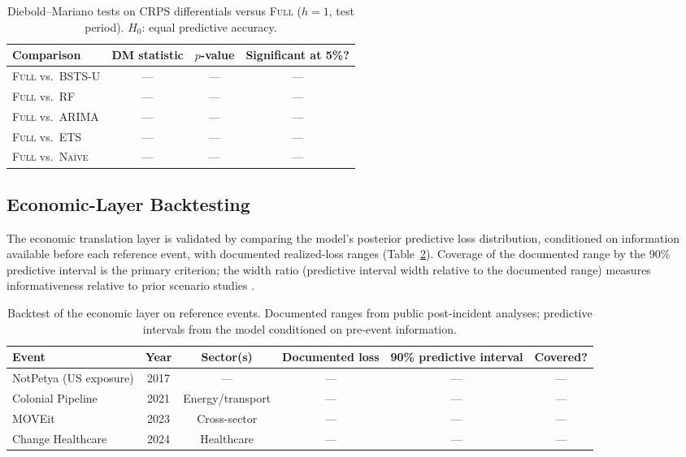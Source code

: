 \documentclass[review]{elsarticle}
\begin{document}
\begin{table}
\centering
\caption{Diebold--Mariano tests on CRPS differentials versus \textsc{Full} ($h=1$, test period). $H_0$: equal predictive accuracy.}
\label{tab:dm}
\small
\begin{tabular}{lccc}
\toprule
Comparison & DM statistic & $p$-value & Significant at 5\%? \\
\midrule
\textsc{Full} vs.\ \textsc{BSTS-U}   & --- & --- & --- \\
\textsc{Full} vs.\ \textsc{RF}       & --- & --- & --- \\
\textsc{Full} vs.\ \textsc{ARIMA}    & --- & --- & --- \\
\textsc{Full} vs.\ \textsc{ETS}      & --- & --- & --- \\
\textsc{Full} vs.\ \textsc{Na\"ive}  & --- & --- & --- \\
\bottomrule
\end{tabular}
\end{table}

\subsection{Economic-Layer Backtesting}

The economic translation layer is validated by comparing the model's posterior predictive loss distribution, conditioned on information available before each reference event, with documented realized-loss ranges (Table~\ref{tab:events}). Coverage of the documented range by the 90\% predictive interval is the primary criterion; the width ratio (predictive interval width relative to the documented range) measures informativeness relative to prior scenario studies \citep{welburn2022}.

\begin{table}
\centering
\caption{Backtest of the economic layer on reference events. Documented ranges from public post-incident analyses; predictive intervals from the model conditioned on pre-event information.}
\label{tab:events}
\small
\begin{tabular}{lccccc}
\toprule
Event & Year & Sector(s) & Documented loss & 90\% predictive interval & Covered? \\
\midrule
NotPetya (US exposure)  & 2017 & --- & --- & --- & --- \\
Colonial Pipeline       & 2021 & Energy/transport & --- & --- & --- \\
MOVEit                  & 2023 & Cross-sector & --- & --- & --- \\
Change Healthcare       & 2024 & Healthcare & --- & --- & --- \\
\bottomrule
\end{tabular}
\end{table}
\end{document}

